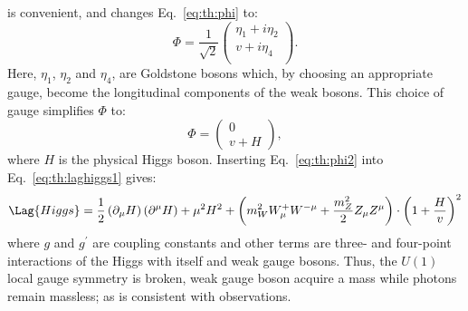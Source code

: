 is convenient, and changes Eq.~\ref{eq:th:phi} to:
\begin{equation}
  \Phi = \frac{1}{\sqrt{2}}
  \begin{pmatrix}
    \eta_1 + i\eta_2 \\
    v + i\eta_4 \\
  \end{pmatrix}.
  \label{eq:th:eta}
\end{equation}
Here, $\eta_1$, $\eta_2$ and $\eta_4$, are Goldstone bosons which, by choosing an appropriate
gauge, become the longitudinal components of the weak bosons.
This choice of gauge simplifies $\Phi$ to:
\begin{equation}
  \Phi =
  \begin{pmatrix} 0 \\ v+H
  \end{pmatrix},
  \label{eq:th:phi2}
\end{equation}
where $H$ is the physical Higgs boson.
Inserting Eq.~\ref{eq:th:phi2} into Eq.~\ref{eq:th:laghiggs1} gives:
\begin{equation}
  \Lag{Higgs} =
  \frac12\left(\partial_\mu H\right)\left(\partial^\mu H\right)
  +\mu^2H^2
  +\left(m_W^2W_\mu^+W^{-\mu} + \frac{m_Z^2}{2}Z_\mu Z^\mu\right)
  \cdot
  \left(1 + \frac{H}{v}\right)^2
  \label{eq:th:laghiggs2}
\end{equation}
where $g$ and $g^\prime$ are coupling constants and other terms are three- and four-point
interactions of the Higgs with itself and weak gauge bosons.
Thus, the $U(1)$ local gauge symmetry is broken, weak gauge boson acquire a mass while photons remain
massless; as is consistent with observations.


